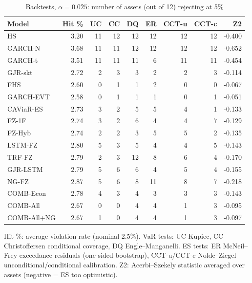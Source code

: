 \begin{table}[htbp]
\centering
\footnotesize
\caption{Backtests, $\alpha=0.025$: number of assets (out of 12) rejecting at 5\%}
\label{tab:bt_a025}
\begin{tabular}{lrrrrrrrr}
\toprule
Model & Hit \% & UC & CC & DQ & ER & CCT-u & CCT-c & Z2 \\
\midrule
HS & 3.20 & 11 & 12 & 12 & 12 & 12 & 12 & -0.400 \\
GARCH-N & 3.68 & 11 & 11 & 12 & 12 & 12 & 12 & -0.652 \\
GARCH-t & 3.51 & 11 & 11 & 11 & 6 & 11 & 11 & -0.454 \\
GJR-skt & 2.72 & 2 & 3 & 3 & 2 & 2 & 3 & -0.114 \\
FHS & 2.60 & 0 & 1 & 1 & 2 & 0 & 0 & -0.067 \\
GARCH-EVT & 2.58 & 0 & 1 & 1 & 1 & 0 & 1 & -0.051 \\
CAViaR-ES & 2.73 & 3 & 2 & 5 & 5 & 4 & 1 & -0.133 \\
FZ-1F & 2.74 & 3 & 2 & 6 & 4 & 4 & 7 & -0.129 \\
FZ-Hyb & 2.74 & 2 & 2 & 3 & 5 & 5 & 2 & -0.135 \\
LSTM-FZ & 2.80 & 5 & 3 & 5 & 4 & 4 & 5 & -0.143 \\
TRF-FZ & 2.79 & 2 & 3 & 12 & 8 & 6 & 4 & -0.170 \\
GJR-LSTM & 2.79 & 5 & 6 & 6 & 4 & 5 & 4 & -0.155 \\
NG-FZ & 2.87 & 5 & 6 & 8 & 11 & 8 & 7 & -0.218 \\
COMB-Econ & 2.78 & 4 & 3 & 4 & 3 & 3 & 3 & -0.143 \\
COMB-All & 2.67 & 0 & 0 & 4 & 4 & 1 & 3 & -0.095 \\
COMB-All+NG & 2.67 & 1 & 0 & 4 & 4 & 1 & 3 & -0.097 \\
\bottomrule
\end{tabular}
\par\smallskip\parbox{\linewidth}{\scriptsize Hit \%: average violation rate (nominal 2.5\%). VaR tests: UC Kupiec, CC Christoffersen conditional coverage, DQ Engle--Manganelli. ES tests: ER McNeil--Frey exceedance residuals (one-sided bootstrap), CCT-u/CCT-c Nolde--Ziegel unconditional/conditional calibration. Z2: Acerbi--Szekely statistic averaged over assets (negative = ES too optimistic).}
\end{table}